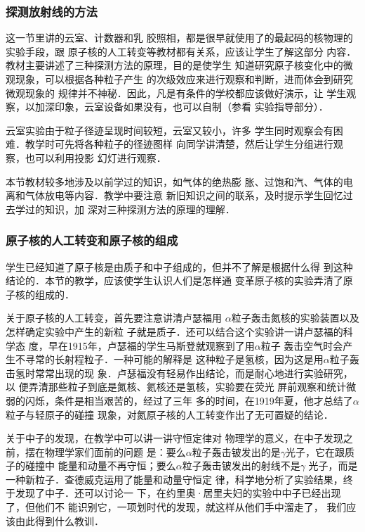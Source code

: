 \subsubsection{探测放射线的方法}

这一节里讲的云室、计数器和乳
胶照相，都是很早就使用了的最起码的核物理的实验手段，跟
原子核的人工转变等教材都有关系，应该让学生了解这部分
内容．教材主要讲述了三种探测方法的原理，目的是使学生
知道研究原子核变化中的微观现象，可以根据各种粒子产生
的次级效应来进行观察和判断，进而体会到研究微观现象的
规律并不神秘．因此，凡是有条件的学校都应该做好演示，让
学生观察，以加深印象，云室设备如果没有，也可以自制（参看
实验指导部分）．

云室实验由于粒子径迹呈现时间较短，云室又较小，许多
学生同时观察会有困难．教学时可先将各种粒子的径迹图样
向同学讲清楚，然后让学生分组进行观察，也可以利用投影
幻灯进行观察．

本节教材较多地涉及以前学过的知识，如气体的绝热膨
胀、过饱和汽、气体的电离和气体放电等内容．教学中要注意
新旧知识之间的联系，及时提示学生回忆过去学过的知识，加
深对三种探测方法的原理的理解．

\subsubsection{原子核的人工转变和原子核的组成}
学生已经知道了原子核是由质子和中子组成的，但并不了解是根据什么得
到这种结论的．本节的教学，应该使学生认识人们是怎样通
变革原子核的实验弄清了原子核的组成的．

关于原子核的人工转变，首先要注意讲清卢瑟福用
$\alpha$粒子轰击氮核的实验装置以及怎样确定实验中产生的新粒
子就是质子．还可以结合这个实验讲一讲卢瑟福的科学态
度，早在1915年，卢瑟福的学生马斯登就观察到了用$\alpha$粒子
轰击空气时会产生不寻常的长射程粒子．一种可能的解释是
这种粒子是氢核，因为这是用$\alpha$粒子轰击氢时常常出现的现
象．卢瑟福没有轻易作出结论，而是耐心地进行实验研究，以
便弄清那些粒子到底是氮核、氦核还是氢核，实验要在荧光
屏前观察和统计微弱的闪烁，条件是相当艰苦的，经过了三年
多的时间，在1919年夏，他才总结了$\alpha$粒子与轻原子的碰撞
现象，对氮原子核的人工转变作出了无可置疑的结论．

关于中子的发现，在教学中可以讲一讲守恒定律对
物理学的意义，在中子发现之前，摆在物理学家们面前的问题
是：要么$\alpha$粒子轰击铍发出的是$\gamma$光子，它在跟质子的碰撞中
能量和动量不再守恒；要么$\alpha$粒子轰击铍发出的射线不是$\gamma$
光子，而是一种新粒子．查德威克运用了能量和动量守恒定
律，科学地分析了实验结果，终于发现了中子．还可以讨论一
下，在约里奥·居里夫妇的实验中中子已经出现了，但他们不
能识别它，一项划时代的发现，就这样从他们手中溜走了，
我们应该由此得到什么教训．

